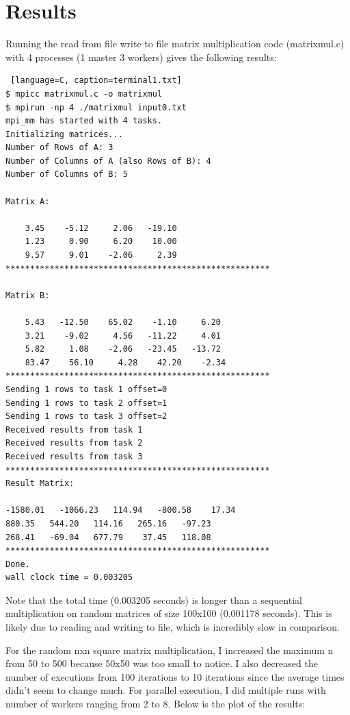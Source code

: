 \documentclass[12pt]{report}
\begin{document}
\chapter{Results}
Running the read from file write to file matrix multiplication code (matrixmul.c) with 4 processes (1 master 3 workers) gives the following results:
\begin{lstlisting} [language=C, caption=terminal1.txt]
$ mpicc matrixmul.c -o matrixmul
$ mpirun -np 4 ./matrixmul input0.txt
mpi_mm has started with 4 tasks.
Initializing matrices...
Number of Rows of A: 3
Number of Columns of A (also Rows of B): 4
Number of Columns of B: 5

Matrix A:

    3.45    -5.12     2.06   -19.10
    1.23     0.90     6.20    10.00
    9.57     9.01    -2.06     2.39
******************************************************

Matrix B:

    5.43   -12.50    65.02    -1.10     6.20
    3.21    -9.02     4.56   -11.22     4.01
    5.82     1.08    -2.06   -23.45   -13.72
    83.47    56.10     4.28    42.20    -2.34
******************************************************
Sending 1 rows to task 1 offset=0
Sending 1 rows to task 2 offset=1
Sending 1 rows to task 3 offset=2
Received results from task 1
Received results from task 2
Received results from task 3
******************************************************
Result Matrix:

-1580.01   -1066.23   114.94   -800.58    17.34
880.35   544.20   114.16   265.16   -97.23
268.41   -69.04   677.79    37.45   118.08
******************************************************
Done.
wall clock time = 0.003205
\end{lstlisting}

Note that the total time (0.003205 seconds) is longer than a sequential multiplication on random matrices of size 100x100 (0.001178 seconds).
This is likely due to reading and writing to file, which is incredibly slow in comparison.

For the random nxn square matrix multiplication, I increased the maximum n from 50 to 500 because 50x50 was too small to notice.
I also decreased the number of executions from 100 iterations to 10 iterations since the average times didn't seem to change much.
For parallel execution, I did multiple runs with number of workers ranging from 2 to 8. Below is the plot of the results:
\end{document}
